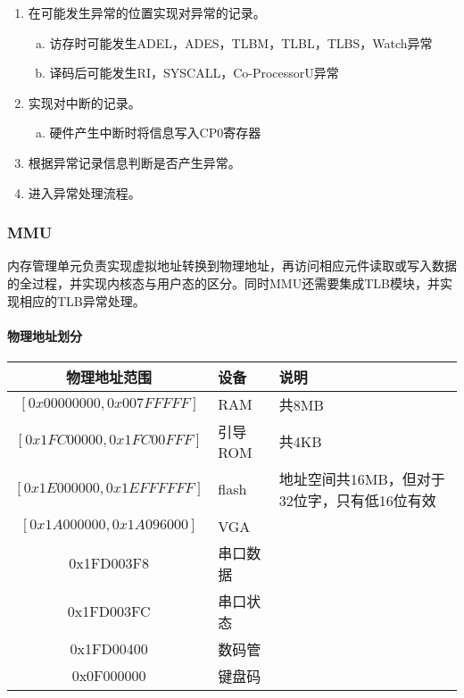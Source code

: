 \begin{enumerate}[(1)]
\item 在可能发生异常的位置实现对异常的记录。

\begin{enumerate}[(a)]
\item 访存时可能发生ADEL，ADES，TLBM，TLBL，TLBS，Watch异常

\item 译码后可能发生RI，SYSCALL，Co-ProcessorU异常
\end{enumerate}
\item 实现对中断的记录。

\begin{enumerate}[(a)]
\item 硬件产生中断时将信息写入CP0寄存器
\end{enumerate}

\item 根据异常记录信息判断是否产生异常。

\item 进入异常处理流程。

\end{enumerate}

\subsubsection{MMU}
内存管理单元负责实现虚拟地址转换到物理地址，再访问相应元件读取或写入数据的全过程，并实现内核态与用户态的区分。同时MMU还需要集成TLB模块，并实现相应的TLB异常处理。

\paragraph{物理地址划分}

\quad

\quad

\begin{table}[H]
\centering
\begin{tabular}{cll}
\hline
物理地址范围&设备&说明\\
\hline
$\left[ 0x00000000, 0x007FFFFF\right] $&RAM&共8MB\\
$\left[ 0x1FC00000, 0x1FC00FFF\right] $&引导ROM&共4KB\\
$\left[ 0x1E000000, 0x1EFFFFFF\right] $&flash&地址空间共16MB，但对于32位字，只有低16位有效\\
$\left[ 0x1A000000, 0x1A096000\right] $&VGA&\\
0x1FD003F8&串口数据&\\
0x1FD003FC&串口状态&\\
0x1FD00400&数码管&\\
0x0F000000&键盘码&\\
\hline
\end{tabular}
\end{table}

